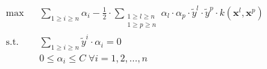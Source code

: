                 \begin{equation}
                    \label{eq::kernel_soft_svm_dual}
                    \begin{aligned}
                        & \max
                        & & \sum_{1\geq i \geq n} \alpha_i - \frac{1}{2}\cdot\sum_{\substack{1\geq l \geq n\\1\geq p \geq n}}\alpha_l\cdot\alpha_p\cdot\tilde{y}^l\cdot\tilde{y}^p\cdot k(\bm{x}^l, \bm{x}^p)\\
                        &\text{s.t.} & & \sum_{1\geq i \geq n}\tilde{y}^i\cdot\alpha_i=0 \\
                        & & & 0 \leq \alpha_i \leq C \;\forall i=1,2,\dots,n
                        \end{aligned}
                \end{equation}

